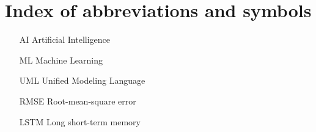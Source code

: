 
\chapter{Index of abbreviations and symbols}

\begin{itemize}
\item[AI] Artificial Intelligence
\item[ML] Machine Learning 
\item[UML] Unified Modeling Language
\item[RMSE] Root-mean-square error
\item[LSTM] Long short-term memory
\end{itemize}
